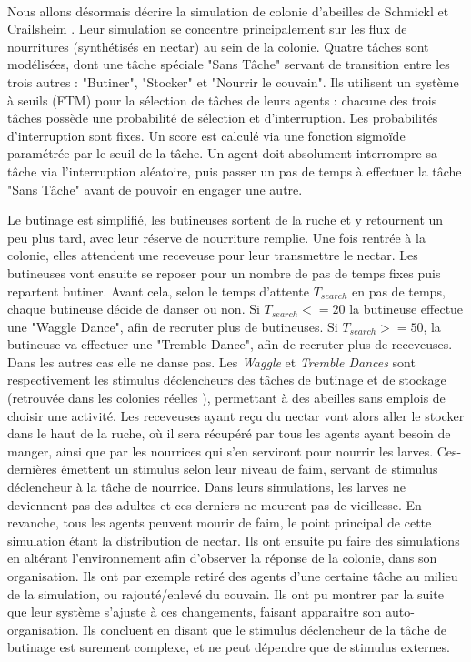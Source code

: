         \paragraph{}
        Nous allons désormais décrire la simulation de colonie d'abeilles de Schmickl et Crailsheim \cite{schmickl_analysing_2008}. Leur simulation se concentre principalement sur les flux de nourritures (synthétisés en nectar) au sein de la colonie. Quatre tâches sont modélisées, dont une tâche spéciale "Sans Tâche" servant de transition entre les trois autres : "Butiner", "Stocker" et "Nourrir le couvain". Ils utilisent un système à seuils (FTM) pour la sélection de tâches de leurs agents : chacune des trois tâches possède une probabilité de sélection et d'interruption. Les probabilités d'interruption sont fixes. Un score est calculé via une fonction sigmoïde paramétrée par le seuil de la tâche. Un agent doit absolument interrompre sa tâche via l'interruption aléatoire, puis passer un pas de temps à effectuer la tâche "Sans Tâche" avant de pouvoir en engager une autre. 
        
        Le butinage est simplifié, les butineuses sortent de la ruche et y retournent un peu plus tard, avec leur réserve de nourriture remplie. Une fois rentrée à la colonie, elles attendent une receveuse pour leur transmettre le nectar. Les butineuses vont ensuite se reposer pour un nombre de pas de temps fixes puis repartent butiner. Avant cela, selon le temps d'attente $T_{search}$ en pas de temps, chaque butineuse décide de danser ou non. Si $T_{search} <= 20$ la butineuse effectue une "Waggle Dance", afin de recruter plus de butineuses. Si $T_{search} >= 50$, la butineuse va effectuer une "Tremble Dance", afin de recruter plus de receveuses. Dans les autres cas elle ne danse pas. Les \textit{Waggle} et \textit{Tremble Dances} sont respectivement les stimulus déclencheurs des tâches de butinage et de stockage (retrouvée dans les colonies réelles \cite{winston_biology_1991}), permettant à des abeilles sans emplois de choisir une activité. 
        Les receveuses ayant reçu du nectar vont alors aller le stocker dans le haut de la ruche, où il sera récupéré par tous les agents ayant besoin de manger, ainsi que par les nourrices qui s'en serviront pour nourrir les larves. Ces-dernières émettent un stimulus selon leur niveau de faim, servant de stimulus déclencheur à la tâche de nourrice. Dans leurs simulations, les larves ne deviennent pas des adultes et ces-derniers ne meurent pas de vieillesse. En revanche, tous les agents peuvent mourir de faim, le point principal de cette simulation étant la distribution de nectar. Ils ont ensuite pu faire des simulations en altérant l'environnement afin d'observer la réponse de la colonie, dans son organisation. Ils ont par exemple retiré des agents d'une certaine tâche au milieu de la simulation, ou rajouté/enlevé du couvain. Ils ont pu montrer par la suite que leur système s'ajuste à ces changements, faisant apparaitre son auto-organisation. Ils concluent en disant que le stimulus déclencheur de la tâche de butinage est surement complexe, et ne peut dépendre que de stimulus externes.
        
